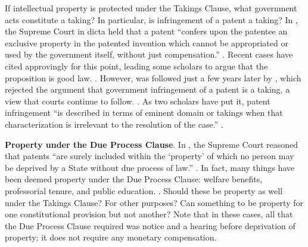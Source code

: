 \item If intellectual property is protected under the Takings Clause, what
government acts constitute a taking? In particular, is infringement of a patent
a taking? In , the Supreme Court in dicta held that a
patent ``confers upon the patentee an exclusive property in the patented
invention which cannot be appropriated or used by the government itself, without
just compensation.'' .
Recent cases have cited  approvingly for this point,
leading some scholars to argue that the proposition is good law. . However,  was followed just a few
years later by , which rejected the argument that
government infringement of a patent is a taking, a view that courts continue to
follow. . As two
scholars have put it, patent infringement ``is described in terms of eminent
domain or takings when that characterization is irrelevant to the resolution of
the case.'' .





\item \textbf{Property under the Due Process Clause}. In
, the Supreme Court reasoned that patents ``are surely
included within the `property' of which no person may be deprived by a State
without due process of law.'' . In fact, many
things have been deemed property under the Due Process Clause: welfare benefits,
professorial tenure, and public education. . Should these be property as well under the Takings
Clause? For other purposes? Can something to be property for one constitutional
provision but not another? Note that in these cases, all that the Due Process
Clause required was notice
and a hearing before deprivation of property; it does not require any monetary
compensation.



